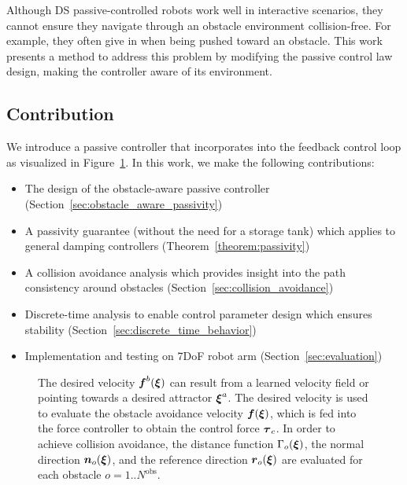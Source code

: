 Although DS passive-controlled robots work well in interactive scenarios, they cannot ensure they navigate through an obstacle environment collision-free. For example, they often give in when being pushed toward an obstacle. This work presents a method to address this problem by modifying the passive control law design, making the controller aware of its environment.

\subsection{Contribution}
We introduce a passive controller that incorporates into the feedback control loop as visualized in Figure~\ref{fig:control_scheme_passive}. 
In this work, we make the following contributions:
\begin{itemize}
\item The design of the obstacle-aware passive controller
(Section~\ref{sec:obstacle_aware_passivity})
\item A passivity guarantee (without the need for a storage tank) which applies to general damping controllers (Theorem~\ref{theorem:passivity})
\item A collision avoidance analysis which provides insight into the path consistency around obstacles (Section~\ref{sec:collision_avoidance})
\item Discrete-time analysis to enable control parameter design which ensures stability (Section~\ref{sec:discrete_time_behavior})
\item Implementation and testing on 7DoF robot arm (Section~\ref{sec:evaluation})
\end{itemize}


\begin{figure}[thb]
  \center
  
\caption{The desired velocity $\boldsymbol{f}^b(\boldsymbol{\xi})$ can result from a learned velocity field or pointing towards a desired attractor $\boldsymbol{\xi}^a$. The desired velocity is used to evaluate the obstacle avoidance velocity $\boldsymbol{f}(\boldsymbol{\xi})$, which is fed into the force controller to obtain the control force $\boldsymbol{\tau}_c$. In order to achieve collision avoidance, the distance function $\Gamma_o(\boldsymbol{\xi})$, the normal direction $\boldsymbol{n}_o(\boldsymbol{\xi})$, and the reference direction $\boldsymbol{r}_o(\boldsymbol{\xi})$ are evaluated for each obstacle $o = 1 .. N^\mathrm{{obs}}$.}
\label{fig:control_scheme_passive}
\end{figure}
